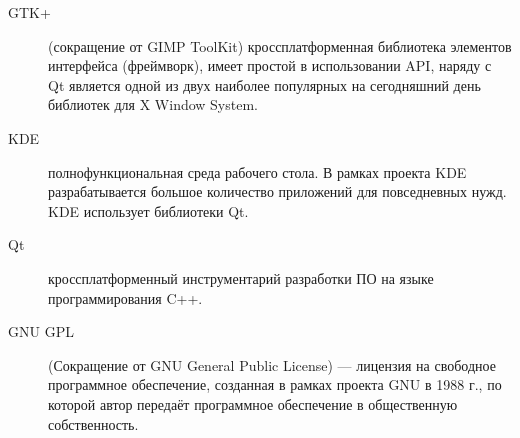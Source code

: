\Abbreviations %
\begin{description}
\item[GTK+]  (сокращение от GIMP ToolKit) кроссплатформенная библиотека элементов интерфейса (фреймворк), имеет простой в использовании API, наряду с Qt является одной из двух наиболее популярных на сегодняшний день библиотек для X Window System.
\item[KDE] полнофункциональная среда рабочего стола. В рамках проекта KDE разрабатывается большое количество приложений для повседневных нужд. KDE использует библиотеки Qt.
\item[Qt] кроссплатформенный инструментарий разработки ПО на языке программирования C++.
\item[GNU GPL] (Сокращение от GNU General Public License) — лицензия на свободное программное обеспечение, созданная в рамках проекта GNU в 1988 г., по которой автор передаёт программное обеспечение в общественную собственность.
\end{description}

